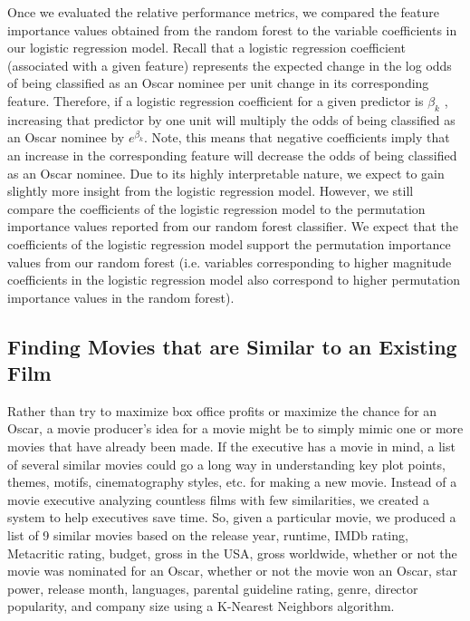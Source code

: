 \documentclass[10pt]{article}
\begin{document}
Once we evaluated the relative performance metrics, we compared the feature importance values obtained from the random forest to the variable coefficients in our logistic regression model. Recall that a logistic regression coefficient (associated with a given feature) represents the expected change in the log odds of being classified as an Oscar nominee per unit change in its corresponding feature. Therefore, if a logistic regression coefficient for a given predictor is $\beta_k$ , increasing that predictor by one unit will multiply the odds of being classified as an Oscar nominee by $e^{\beta_k}$. Note, this means that negative coefficients imply that an increase in the corresponding feature will decrease the odds of being classified as an Oscar nominee. Due to its highly interpretable nature, we expect to gain slightly more insight from the logistic regression model. However, we still compare the coefficients of the logistic regression model to the permutation importance values reported from our random forest classifier. We expect that the coefficients of the logistic regression model support the permutation importance values from our random forest (i.e. variables corresponding to higher magnitude coefficients in the logistic regression model also correspond to higher permutation importance values in the random forest).

\subsection{Finding Movies that are Similar to an Existing Film}

Rather than try to maximize box office profits or maximize the chance for an Oscar, a movie producer’s idea for a movie might be to simply mimic one or more movies that have already been made. If the executive has a movie in mind, a list of several similar movies could go a long way in understanding key plot points, themes, motifs, cinematography styles, etc. for making a new movie. Instead of a movie executive analyzing countless films with few similarities, we created a system to help executives save time. So, given a particular movie, we produced a list of 9 similar movies based on the release year, runtime, IMDb rating, Metacritic rating, budget, gross in the USA, gross worldwide, whether or not the movie was nominated for an Oscar, whether or not the movie won an Oscar, star power, release month, languages, parental guideline rating, genre, director popularity, and company size using a K-Nearest Neighbors algorithm.
\end{document}
